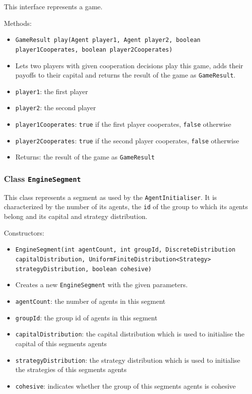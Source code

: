 \documentclass[parskip=full,11pt]{scrartcl}
\begin{document}
This interface represents a game.

Methods:
\begin{itemize}\itemsep -10pt
\item[] \texttt{GameResult play(Agent player1, Agent player2, boolean player1Cooperates, boolean player2Cooperates)}
\item[] Lets two players with given cooperation decisions play this game, adds their payoffs to their capital and returns the result of the game as \texttt{GameResult}.
\item[] \texttt{player1}: the first player
\item[] \texttt{player2}: the second player
\item[] \texttt{player1Cooperates}: \texttt{true} if the first player cooperates, \texttt{false} otherwise
\item[] \texttt{player2Cooperates}: \texttt{true} if the second player cooperates, \texttt{false} otherwise
\item[] Returns: the result of the game as \texttt{GameResult}
\end{itemize}

\subsubsection{Class \texttt{EngineSegment}}

This class represents a segment as used by the \texttt{AgentInitialiser}. It is characterized by the number of its agents, the \texttt{id} of the group to which its agents belong and its capital and strategy distribution.

Constructors:
\begin{itemize} \itemsep -10pt
	\item \texttt{EngineSegment(int agentCount, int groupId, DiscreteDistribution capitalDistribution, UniformFiniteDistribution<Strategy> strategyDistribution, boolean cohesive)}
	\item[] Creates a new \texttt{EngineSegment} with the given parameters.
	\item[] \texttt{agentCount}: the number of agents in this segment
	\item[] \texttt{groupId}: the group id of agents in this segment
	\item[] \texttt{capitalDistribution}: the capital distribution which is used to initialise the capital of this segments agents
	\item[] \texttt{strategyDistribution}: the strategy distribution which is used to initialise the strategies of this segments agents
	\item[] \texttt{cohesive}: indicates whether the group of this segments agents is cohesive
\end{itemize}
\end{document}

